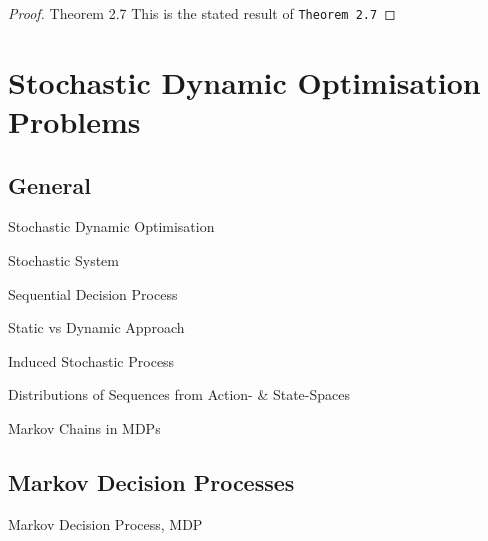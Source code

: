 \documentclass[11pt,a4paper]{article}
\begin{document}
\begin{proof}{Theorem 2.7}
    This is the stated result of \texttt{Theorem 2.7} \proved
  \end{proof}

\section{Stochastic Dynamic Optimisation Problems}

\subsection{General} %

  \begin{definition}{Stochastic Dynamic Optimisation}

  \end{definition}

  \begin{definition}{Stochastic System}

  \end{definition}

  \begin{definition}{Sequential Decision Process}
  \end{definition}

  \begin{remark}{Static vs Dynamic Approach}

  \end{remark}

  \begin{definition}{Induced Stochastic Process}

  \end{definition}

  \begin{proposition}{Distributions of Sequences from Action- \& State-Spaces}
  \end{proposition}

  \begin{theorem}{Markov Chains in MDPs}

  \end{theorem}

\subsection{Markov Decision Processes}

  \begin{definition}{Markov Decision Process, MDP}

  \end{definition}
\end{document}
